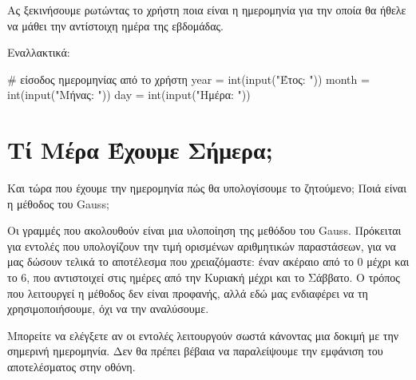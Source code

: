 \documentclass[a4paper,11pt,oneside]{book}
\begin{document}
Ας ξεκινήσουμε ρωτώντας το χρήστη ποια είναι η ημερομηνία για την οποία θα ήθελε να μάθει την αντίστοιχη ημέρα της εβδομάδας.


Εναλλακτικά:

\begin{pycode}
# είσοδος ημερομηνίας από το χρήστη
year = int(input("Έτος: "))
month = int(input("Mήνας: "))
day = int(input("Ημέρα: "))
\end{pycode}


\section{Τί Μέρα Έχουμε Σήμερα;}

\begin{question}
Και τώρα που έχουμε την ημερομηνία πώς θα υπολογίσουμε το ζητούμενο; Ποιά είναι η μέθοδος του Gauss;
\end{question}

Οι γραμμές που ακολουθούν είναι μια υλοποίηση της μεθόδου του Gauss. Πρόκειται για εντολές που υπολογίζουν την τιμή ορισμένων αριθμητικών παραστάσεων, για να μας δώσουν τελικά το αποτέλεσμα που χρειαζόμαστε: έναν ακέραιο από το 0 μέχρι και το 6, που αντιστοιχεί στις ημέρες από την Κυριακή μέχρι και το Σάββατο. Ο τρόπος που λειτουργεί η μέθοδος δεν είναι προφανής, αλλά εδώ μας ενδιαφέρει να τη χρησιμοποιήσουμε, όχι να την αναλύσουμε.


Μπορείτε να ελέγξετε αν οι εντολές λειτουργούν σωστά κάνοντας μια δοκιμή με την σημερινή ημερομηνία. Δεν θα πρέπει βέβαια να παραλείψουμε την εμφάνιση του αποτελέσματος στην οθόνη.
\end{document}
